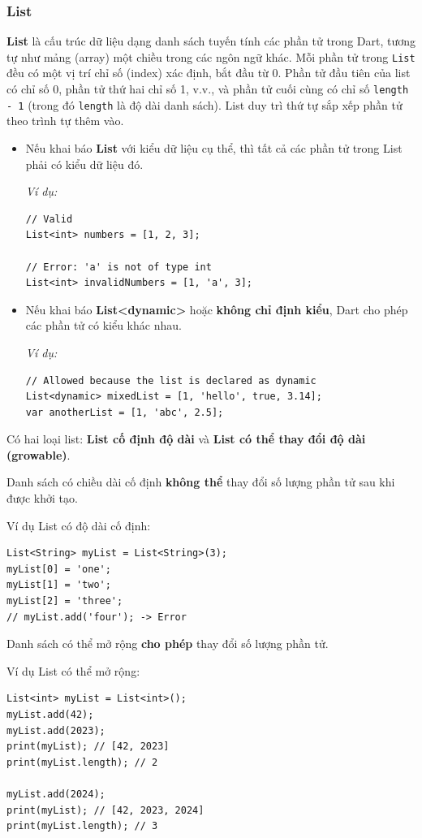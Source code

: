 \documentclass[../DoAn.tex]{subfiles}
\numberwithin{figure}{chapter}
\begin{document}
\subsubsection{List} 
\textbf{List} là cấu trúc dữ liệu dạng danh sách tuyến tính các phần tử trong Dart, tương tự như mảng (array) một chiều trong các ngôn ngữ khác. Mỗi phần tử trong \texttt{List} đều có một vị trí chỉ số (index) xác định, bắt đầu từ 0. Phần tử đầu tiên của list có chỉ số 0, phần tử thứ hai chỉ số 1, v.v., và phần tử cuối cùng có chỉ số \texttt{length - 1} (trong đó \texttt{length} là độ dài danh sách). List duy trì thứ tự sắp xếp phần tử theo trình tự thêm vào.
\begin{itemize}
\item Nếu khai báo \textbf{List} với kiểu dữ liệu cụ thể, thì tất cả các phần tử trong List phải có kiểu dữ liệu đó. 

\textit{Ví dụ:} 
\begin{lstlisting}
// Valid
List<int> numbers = [1, 2, 3];

// Error: 'a' is not of type int
List<int> invalidNumbers = [1, 'a', 3];  
\end{lstlisting}

\item Nếu khai báo \textbf{List<dynamic>} hoặc \textbf{không chỉ định kiểu}, Dart cho phép các phần tử có kiểu khác nhau.

\textit{Ví dụ:}
\begin{lstlisting}
// Allowed because the list is declared as dynamic
List<dynamic> mixedList = [1, 'hello', true, 3.14];
var anotherList = [1, 'abc', 2.5];
\end{lstlisting}

\end{itemize}

Có hai loại list: \textbf{List cố định độ dài} và \textbf{List có thể thay đổi độ dài (growable)}. 

Danh sách có chiều dài cố định \textbf{không thể} thay đổi số lượng phần tử sau khi được khởi tạo. 

Ví dụ List có độ dài cố định:
\begin{lstlisting}
List<String> myList = List<String>(3);
myList[0] = 'one';
myList[1] = 'two';
myList[2] = 'three';
// myList.add('four'); -> Error
\end{lstlisting}

Danh sách có thể mở rộng \textbf{cho phép} {thay đổi số lượng} phần tử. 

Ví dụ List có thể mở rộng:
\begin{lstlisting}
List<int> myList = List<int>();
myList.add(42);
myList.add(2023);
print(myList); // [42, 2023]
print(myList.length); // 2

myList.add(2024);
print(myList); // [42, 2023, 2024]
print(myList.length); // 3
\end{lstlisting}
\end{document}
